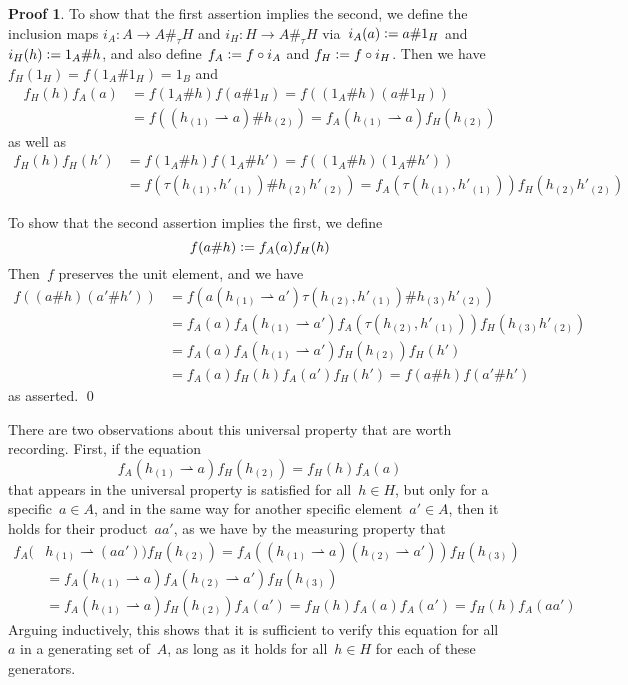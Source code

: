 \documentclass{article}
\numberwithin{equation}{section}
\theoremstyle{definition}
\newtheorem*{pf}{Proof}
\theoremstyle{break}
\newcommand{\deq}{\vcentcolon =}
\newcommand{\1}{{(1)}}
\newcommand{\2}{{(2)}}
\newcommand{\3}{{(3)}}
\newcommand{\ra}{\rightarrow}
\newcommand{\A}{1_A}
\newcommand{\B}{1_B}
\newcommand{\HH}{1_H}
\begin{document}
\begin{pf}
To show that the first assertion implies the second, we define the inclusion maps $i_A \colon A\ra A \#_{\tau } H$ and $i_H \colon H \ra  A \#_{\tau } H$ 
via~$i_A(a) \deq a \# \HH$ and \mbox{$i_H(h) \deq \A \# h$}, and also define $f_A \deq f \circ i_A$ and $f_H \deq f \circ i_H$. Then we have $f_H(\HH) = f(\A \# \HH) = \B$ and
\begin{align*}
f_H(h) f_A(a)  &= f(\A \# h)f(a \# \HH) =
f\left( (\A \# h)(a \# \HH)\right)\\
& = f\left( (h_\1 \rightharpoonup a) \# h_\2 \right) = f_A(h_\1 \rightharpoonup a) f_H(h_\2)
\end{align*}
as well as
\begin{align*}
f_H(h) f_H(h')  &=
f(\A \# h) f(\A \# h')=f\left( (\A \# h) (\A \# h')\right)  \\
&=
f \left( \tau(h_\1, h'_\1) \# h_\2 h'_\2\right) = f_A(\tau(h_\1, h'_\1)) f_H(h_\2 h'_\2)
\end{align*}

To show that the second assertion implies the first, we define
\[f(a \# h) \deq f_A(a) f_H(h)\]
Then~$f$ preserves the unit element, and we have
\begin{align*}
f((a \# h)(a' \# h')) &= f(a (h_\1 \rightharpoonup a') \tau(h_\2, h'_\1) \# h_\3 h'_\2) \\
&= f_A(a) f_A(h_\1 \rightharpoonup a') f_A(\tau(h_\2, h'_\1)) f_H(h_\3 h'_\2) \\
&= f_A(a) f_A(h_\1 \rightharpoonup a') f_H(h_\2) f_H(h') \\
&= f_A(a) f_H(h) f_A(a') f_H(h') = f(a \# h) f(a' \# h')
\end{align*}
as asserted.
\qed
\end{pf}

There are two observations about this universal property that are worth recording. First, if the equation
\[f_A(h_\1 \rightharpoonup a) f_H(h_\2) = f_H(h) f_A(a)\]
that appears in the universal property is satisfied for all~$h \in H$, but only for a
specific~$a \in A$, and in the same way for another specific element~$a' \in A$, then it holds for their product~$aa'$, as we have by the measuring property that
\begin{align*}
f_A(&h_\1 \rightharpoonup (aa')) f_H(h_\2) =
f_A((h_\1 \rightharpoonup a) (h_\2 \rightharpoonup a')) f_H(h_\3) \\
&= f_A(h_\1 \rightharpoonup a) f_A(h_\2 \rightharpoonup a') f_H(h_\3) \\
&= f_A(h_\1 \rightharpoonup a) f_H(h_\2) f_A(a') = f_H(h) f_A(a) f_A(a') = f_H(h) f_A(aa')
\end{align*}
Arguing inductively, this shows that it is sufficient to verify this equation for all~$a$ in a generating set of~$A$, as long as it holds for all~$h \in H$ for each of these generators.
\end{document}
